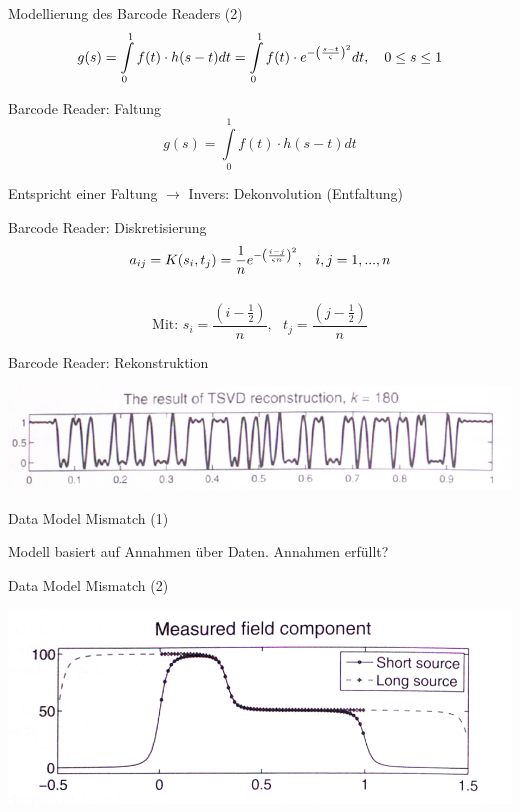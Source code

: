 \documentclass[11pt]{beamer}
\begin{document}
\begin{frame}{Modellierung des Barcode Readers (2)}
\[g(s) = \int\limits_{0}^1 f(t) \cdot h(s-t) dt = \int\limits_{0}^1 f(t) \cdot e^{-\left(s-t \over \varsigma\right)^2} dt, \, \, \, \, \, \, 0 \leq s \leq 1 \]
\end{frame}


\begin{frame}{Barcode Reader: Faltung}
\[
g(s) = \int\limits_{0}^1 f(t) \cdot h(s-t) dt
\]

Entspricht einer Faltung $\rightarrow$ Invers: Dekonvolution (Entfaltung)
\end{frame}


\begin{frame}{Barcode Reader: Diskretisierung}
\[
a_{ij} = K(s_i, t_j) = \frac{1}{n} e^{-\left(i-j \over \varsigma n\right)^2}, \,\,\,\,\, i,j = 1, ..., n
\]

\[\]

\[
\mbox{Mit: } s_i = \frac{(i- \frac{1}{2})}{n}, \,\,\,\, t_j = \frac{(j - \frac{1}{2})}{n}
\]
\end{frame}


\begin{frame}{Barcode Reader: Rekonstruktion}
\begin{center}
\includegraphics[scale=0.5]{Barcode_TSVD.PNG} 
\end{center}
\end{frame}


\begin{frame}{Data Model Mismatch (1)}

Modell basiert auf Annahmen über Daten. Annahmen erfüllt?

\end{frame}



\begin{frame}{Data Model Mismatch (2)}

\begin{center}

\includegraphics[scale=0.5]{DataModel_graph.PNG} 

\end{center}

\end{frame}
\end{document}

